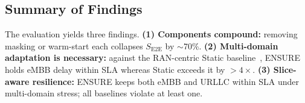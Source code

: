 \documentclass[12pt,lettersize,journal,onecolumn]{IEEEtran}
\begin{document}
\subsection{Summary of Findings}
\label{subsec:findings}
The evaluation yields three findings. \textbf{(1) Components compound:} removing masking or warm-start each collapses $S_{\mathrm{E2E}}$ by ${\sim}$70\%. \textbf{(2) Multi-domain adaptation is necessary:} against the RAN-centric Static baseline~\cite{jiot24filali,camad24ebrahimi}, ENSURE holds eMBB delay within SLA whereas Static exceeds it by $>4\times$. \textbf{(3) Slice-aware resilience:} ENSURE keeps both eMBB and URLLC within SLA under multi-domain stress; all baselines violate at least one.
\end{document}
